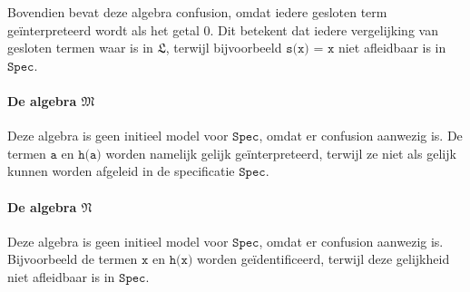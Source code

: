 \documentclass[a4paper,11pt]{article}
\begin{document}
\begin{enumerate}
Bovendien bevat deze algebra confusion, omdat iedere gesloten term
ge\"interpreteerd wordt als het getal 0. Dit betekent dat iedere vergelijking
van gesloten termen waar is in $\mathfrak{L}$, terwijl bijvoorbeeld
$\texttt{s(x) = x}$ niet afleidbaar is in $\texttt{Spec}$.

\paragraph{De algebra $\mathfrak{M}$}

Deze algebra is geen initieel model voor $\texttt{Spec}$, omdat er confusion
aanwezig is. De termen $\texttt{a}$ en $\texttt{h(a)}$ worden namelijk gelijk
ge\"interpreteerd, terwijl ze niet als gelijk kunnen worden afgeleid in de
specificatie $\texttt{Spec}$.

\paragraph{De algebra $\mathfrak{N}$}

Deze algebra is geen initieel model voor $\texttt{Spec}$, omdat er
confusion aanwezig is. Bijvoorbeeld de termen $\texttt{x}$ en $\texttt{h(x)}$
worden ge\"identificeerd, terwijl deze gelijkheid niet afleidbaar is in
$\texttt{Spec}$.

\end{enumerate}
\end{document}
